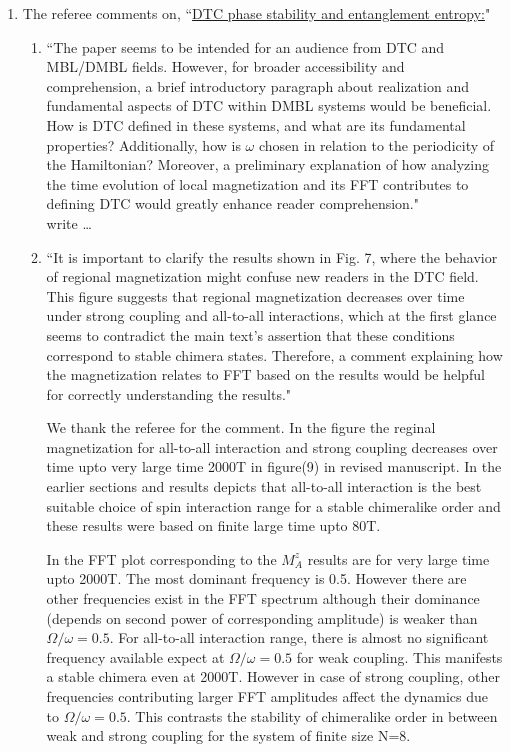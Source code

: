 \documentclass[aps,prb,reprint,showpacs,floatfix,superscriptaddress, onecolumn, nofootinbib, 10pt]{revtex4-2}
\newcommand{\response}[1]{{\color{black}#1}} %
\newcommand{\comment}[1]{{\color{blue}#1}} %
\begin{document}
\begin{enumerate}
\begin{enumerate}
		\item The referee comments on, \comment{``\underline{DTC phase stability and entanglement entropy:}"}
		\begin{enumerate}
			\item \comment{``The paper seems to be intended for an audience from DTC and MBL/DMBL fields. However, for broader accessibility and comprehension, a brief introductory paragraph about realization and fundamental aspects of DTC within DMBL
			systems would be beneficial. How is DTC defined in these systems, and what are its fundamental properties? Additionally, how is $\omega$ chosen in relation to the periodicity of the Hamiltonian? Moreover, a preliminary explanation of how analyzing the time evolution of local magnetization and its FFT contributes to defining DTC would greatly enhance reader comprehension."}\\
		
			\response{ write \dots {}
			}
			\item \comment{``It is important to clarify the results shown in Fig. 7, where the behavior of regional magnetization might confuse new readers in the DTC field. This figure suggests that regional magnetization decreases over time under strong coupling and all-to-all interactions, which at the first glance seems to contradict the main text’s assertion that these conditions correspond to stable chimera states. Therefore, a comment  explaining how the magnetization relates to FFT based on the results would be helpful for correctly understanding the results."}\\
			
			\response{
			We thank the referee for the comment. In the figure the reginal magnetization for all-to-all interaction and strong coupling  decreases over time upto very large time 2000T in figure(9) in revised manuscript. In the earlier sections and results depicts that all-to-all interaction is the best suitable choice of spin interaction range for a stable chimeralike order and these results were based on finite large time upto 80T.
			
			In the FFT plot corresponding to the $M^z_A$ results are for very large time upto 2000T. The most dominant frequency is 0.5. However there are other frequencies exist in the FFT spectrum although their dominance (depends on second power of corresponding amplitude) is weaker than $\Omega/\omega=0.5$. For all-to-all interaction range, there is almost no significant frequency available expect at $\Omega/\omega=0.5$ for weak coupling. This manifests a stable chimera even at 2000T. However in case of strong coupling, other frequencies contributing larger FFT amplitudes affect the dynamics due to  $\Omega/\omega=0.5$. This contrasts the stability of chimeralike order in between  weak and strong coupling for the system of finite size N=8.
			
}
\end{enumerate}
\end{enumerate}
\end{enumerate}
\end{document}
